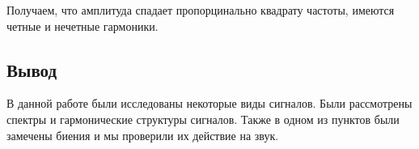 Получаем, что амплитуда спадает пропорцинально квадрату частоты, имеются четные и нечетные гармоники.

\subsection{Вывод}

В данной работе были исследованы некоторые виды сигналов. Были рассмотрены спектры и гармонические структуры сигналов. Также в одном из пунктов были замечены биения и мы проверили их действие на звук.